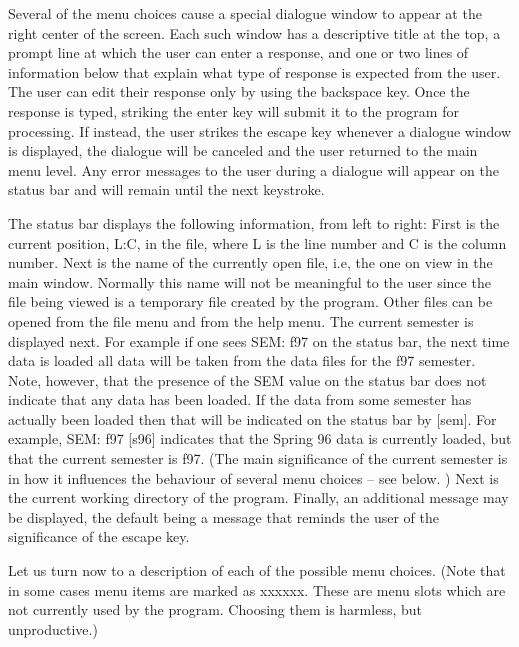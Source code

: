 Several of the menu choices cause a special dialogue window to appear at the
right center of the screen. Each such window has a descriptive title at the
top, a prompt line at which the user can enter a response, and one or two
lines of information below that explain what type of response is expected
from the user. The user can edit their response only by using the backspace
key. Once the response is typed, striking the enter key will submit it to
the program for processing. If instead, the user strikes the escape key 
whenever a dialogue window is displayed, the dialogue will be canceled and
the user returned to the main menu level. Any error messages to the user
during a dialogue will appear on the status bar and will remain until the
next keystroke. 

The status bar displays the following information, from left to right: 
First is 
the current position, L:C, in the file, where L is the line number and C is
the column number. Next is the name of the currently open file, i.e, the
one on view in the main window. Normally this name will not be meaningful
to the user since the file being viewed is a temporary file created by
the program. Other files can be opened from the file menu and from the help
menu.
 The current semester is displayed next. For example if one sees SEM: f97
on the status bar, the next time data is loaded all data will be taken
from the data files for the f97 semester. Note, however, that the 
presence of the SEM value on the status bar does not indicate that any data
has been loaded. If the data from some semester has actually been loaded
then that will be indicated on the status bar by [sem]. For
example, SEM: f97 [s96] indicates that the Spring 96 data is currently
loaded, but that the current semester is f97. (The main significance of the
current semester is in how it influences the behaviour of several menu choices --
see below. ) Next is the current working directory of the program. Finally,
an additional message may be displayed, the default being a message that
reminds the user of the significance of the escape key.

Let us turn now to a description of each of the possible menu choices.
(Note that in some cases menu items are marked as xxxxxx. These are menu
slots which are not currently used by the program. Choosing them is
harmless, but unproductive.)

